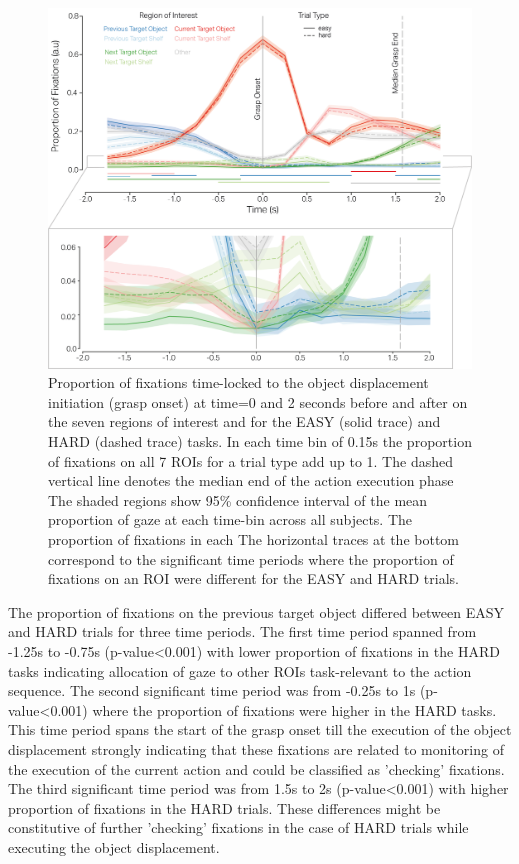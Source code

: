 \begin{figure}[t]
    \centering
    \includegraphics[width=1.\linewidth]{source/figures/results/results_23.png}
    \caption[Time course of fixations]{Proportion of fixations time-locked to the object displacement initiation (grasp onset) at time=0 and 2 seconds before and after on the seven regions of interest and for the EASY (solid trace) and HARD (dashed trace) tasks. In each time bin of 0.15s the proportion of fixations on all 7 ROIs for a trial type add up to 1. The dashed vertical line denotes the median end of the action execution phase The shaded regions show 95\% confidence interval of the mean proportion of gaze at each time-bin across all subjects. The proportion of fixations in each The horizontal traces at the bottom correspond to the significant time periods where the proportion of fixations on an ROI were different for the EASY and HARD trials.}
    \label{figure:action_locked}
\end{figure}


The proportion of fixations on the previous target object differed between EASY and HARD trials for three time periods. The first time period spanned from -1.25s to -0.75s (p-value<0.001) with lower proportion of fixations in the HARD tasks indicating allocation of gaze to other ROIs task-relevant to the action sequence. The second significant time period was from -0.25s to 1s (p-value<0.001) where the proportion of fixations were higher in the HARD tasks. This time period spans the start of the grasp onset till the execution of the object displacement strongly indicating that these fixations are related to monitoring of the execution of the current action and could be classified as 'checking' fixations. The third significant time period was from 1.5s to 2s (p-value<0.001) with higher proportion of fixations in the HARD trials. These differences might be constitutive of further 'checking' fixations in the case of HARD trials while executing the object displacement. 

